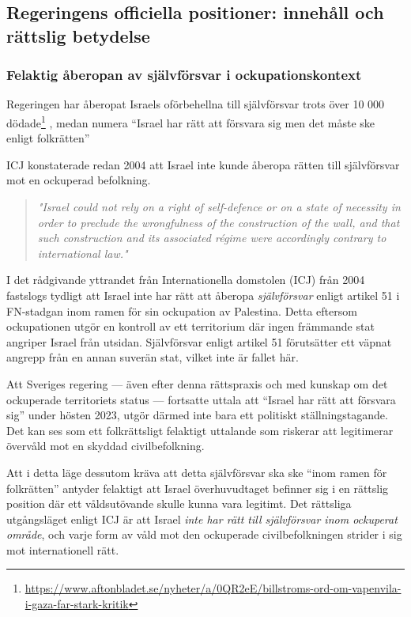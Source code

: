 


\subsection{Regeringens officiella positioner: innehåll och rättslig betydelse}


\subsubsection*{Felaktig åberopan av självförsvar i ockupationskontext}

Regeringen har åberopat Israels oförbehellna till självförsvar trots över 10 000 dödade\footnote{\url{https://www.aftonbladet.se/nyheter/a/0QR2eE/billstroms-ord-om-vapenvila-i-gaza-far-stark-kritik}} , medan numera \enquote{Israel har rätt att försvara sig men det måste ske enligt folkrätten}

ICJ konstaterade redan 2004 att Israel inte kunde åberopa rätten till självförsvar mot en ockuperad befolkning.
\begin{quote}
\itshape
"Israel could not rely on a right of self-defence or on a state of necessity in order to preclude the wrongfulness of the construction of the wall, and that such construction and its associated régime were accordingly contrary to international law."
\end{quote}

I det rådgivande yttrandet från Internationella domstolen (ICJ) från 2004 fastslogs tydligt att Israel inte har rätt att åberopa \textit{självförsvar} enligt artikel 51 i FN-stadgan inom ramen för sin ockupation av Palestina. Detta eftersom ockupationen utgör en kontroll av ett territorium där ingen främmande stat angriper Israel från utsidan. Självförsvar enligt artikel 51 förutsätter ett väpnat angrepp från en annan suverän stat, vilket inte är fallet här.

Att Sveriges regering — även efter denna rättspraxis och med kunskap om det ockuperade territoriets status — fortsatte uttala att \enquote{Israel har rätt att försvara sig} under hösten 2023, utgör därmed inte bara ett politiskt ställningstagande. Det kan ses som ett folkrättsligt felaktigt uttalande som riskerar att legitimerar övervåld mot en skyddad civilbefolkning.

Att i detta läge dessutom kräva att detta självförsvar ska ske \enquote{inom ramen för folkrätten} antyder felaktigt att Israel överhuvudtaget befinner sig i en rättslig position där ett våldsutövande skulle kunna vara legitimt. Det rättsliga utgångsläget enligt ICJ är att Israel \textit{inte har rätt till självförsvar inom ockuperat område}, och varje form av våld mot den ockuperade civilbefolkningen strider i sig mot internationell rätt.

